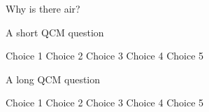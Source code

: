 \documentclass{ecamexam}
\begin{document}

\makecover


\begin{questions}
	\question Why is there air?
	
\end{questions}



\begin{questions}
	\question[2] A short QCM question
	
	\begin{oneparchoices}
		\choice Choice 1
		\choice Choice 2
		\choice Choice 3
		\choice Choice 4
		\choice Choice 5
	\end{oneparchoices}
	
	\question A long QCM question
	
	\begin{choices}
		\choice Choice 1
		\choice Choice 2
		\choice Choice 3
		\choice Choice 4
		\choice Choice 5
	\end{choices}
\end{questions}
\newpage
\end{document}
